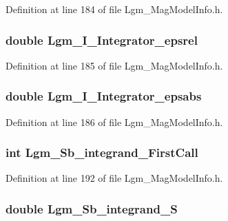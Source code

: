 Definition at line 184 of file Lgm\_\-MagModelInfo.h.\hypertarget{struct_lgm___mag_model_info_1be8f828cb392cad59b8c27918f7862f}{
\subsubsection[{Lgm\_\-I\_\-Integrator\_\-epsrel}]{\setlength{\rightskip}{0pt plus 5cm}double {\bf Lgm\_\-I\_\-Integrator\_\-epsrel}}}
\label{struct_lgm___mag_model_info_1be8f828cb392cad59b8c27918f7862f}




Definition at line 185 of file Lgm\_\-MagModelInfo.h.\hypertarget{struct_lgm___mag_model_info_84d1542c6975c366a6b0387d6497c86b}{
\subsubsection[{Lgm\_\-I\_\-Integrator\_\-epsabs}]{\setlength{\rightskip}{0pt plus 5cm}double {\bf Lgm\_\-I\_\-Integrator\_\-epsabs}}}
\label{struct_lgm___mag_model_info_84d1542c6975c366a6b0387d6497c86b}




Definition at line 186 of file Lgm\_\-MagModelInfo.h.\hypertarget{struct_lgm___mag_model_info_53c05ef170d36948f85a32ca0f5a6912}{
\subsubsection[{Lgm\_\-Sb\_\-integrand\_\-FirstCall}]{\setlength{\rightskip}{0pt plus 5cm}int {\bf Lgm\_\-Sb\_\-integrand\_\-FirstCall}}}
\label{struct_lgm___mag_model_info_53c05ef170d36948f85a32ca0f5a6912}




Definition at line 192 of file Lgm\_\-MagModelInfo.h.\hypertarget{struct_lgm___mag_model_info_ba782efaf640472be322e8290acac370}{
\subsubsection[{Lgm\_\-Sb\_\-integrand\_\-S}]{\setlength{\rightskip}{0pt plus 5cm}double {\bf Lgm\_\-Sb\_\-integrand\_\-S}}}
\label{struct_lgm___mag_model_info_ba782efaf640472be322e8290acac370}




